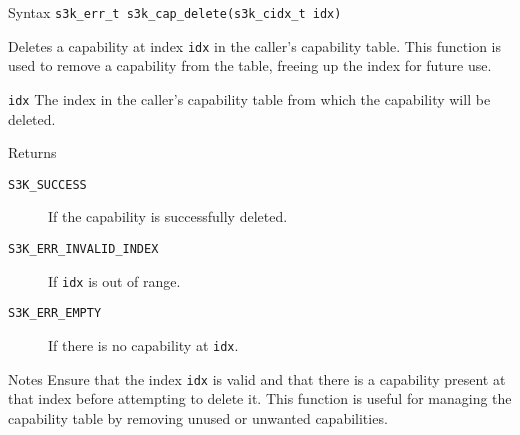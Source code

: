 \documentclass[a4paper,11pt]{article}
\newcommand{\syscall}[1]{\texttt{#1}}
\newenvironment{syscalldoc}[1]{
  \begin{tcolorbox}[breakable,title=\subsection{\syscall{#1}}]
  \begin{description}[leftmargin=!,style=nextline,noitemsep]
}{
  \end{description}
  \end{tcolorbox}
}
\begin{document}
\begin{syscalldoc}{s3k\_cap\_delete}
  \item[Syntax] \lstinline{s3k_err_t s3k_cap_delete(s3k_cidx_t idx)}

  \item[Description] Deletes a capability at index \verb|idx| in the caller's capability table. This function is used to remove a capability from the table, freeing up the index for future use.

  \item[Parameters]
    \begin{description}
      \item[]
      \item[\texttt{idx}] The index in the caller's capability table from which the capability will be deleted.
    \end{description}

  \item[Returns]
    \begin{description}
      \item[]
      \item[\texttt{S3K\_SUCCESS}] If the capability is successfully deleted.
      \item[\texttt{S3K\_ERR\_INVALID\_INDEX}] If \verb|idx| is out of range.
      \item[\texttt{S3K\_ERR\_EMPTY}] If there is no capability at \verb|idx|.
    \end{description}

  \item[Notes] Ensure that the index \verb|idx| is valid and that there is a capability present at that index before attempting to delete it. This function is useful for managing the capability table by removing unused or unwanted capabilities.
\end{syscalldoc}
\end{document}
